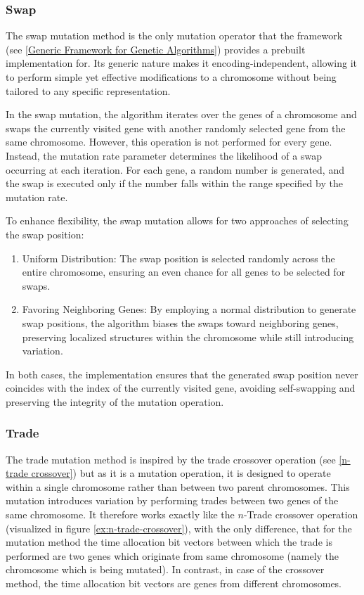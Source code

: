 \documentclass[english,examples]{isasthesis}
\begin{document}
\subsubsection{Swap}
The swap mutation method is the only mutation operator that the framework
(see \ref{Generic Framework for Genetic Algorithms}) provides a prebuilt
implementation for.
Its generic nature makes it encoding-independent, allowing it to perform simple
yet effective modifications to a chromosome without being tailored to any
specific representation.

In the swap mutation, the algorithm iterates over the genes of a chromosome
and swaps the currently visited gene with another randomly selected gene
from the same chromosome. However, this operation is not performed for every
gene. Instead, the mutation rate parameter determines the likelihood of a
swap occurring at each iteration. For each gene, a random number is generated,
and the swap is executed only if the number falls within the range specified
by the mutation rate.

To enhance flexibility, the swap mutation allows for two approaches of
selecting the swap position:
\begin{enumerate}
    \item   Uniform Distribution: The swap position is selected randomly across
            the entire chromosome, ensuring an even chance for all genes to
            be selected for swaps.
    \item   Favoring Neighboring Genes: By employing a normal distribution
            to generate swap positions, the algorithm biases the swaps toward
            neighboring genes, preserving localized structures within the
            chromosome while still introducing variation.
\end{enumerate}

In both cases, the implementation ensures that the generated swap position
never coincides with the index of the currently visited gene, avoiding
self-swapping and preserving the integrity of the mutation operation.

\subsubsection{Trade}
The trade mutation method is inspired by the trade crossover operation 
(see \ref{n-trade crossover}) but as it is a mutation operation, it is designed
to operate within a single chromosome rather than between two parent
chromosomes. This mutation introduces variation by performing trades between
two genes of the same chromosome.
It therefore works exactly like the $n$-Trade crossover operation
(visualized in figure \ref{ex:n-trade-crossover}), with the only difference,
that for the mutation method the time allocation bit vectors between which the
trade is performed are two genes which originate from same chromosome
(namely the chromosome which is being mutated).
In contrast, in case of the crossover method, the time allocation bit vectors
are genes from different chromosomes.
\end{document}

